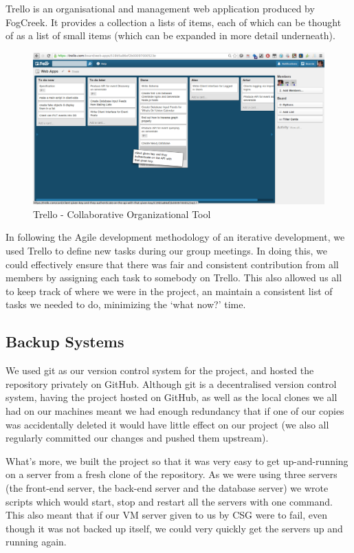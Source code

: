 \documentclass[11pt]{article}
\let\footnote=\endnote
\begin{document}
Trello\footnote{\url{http://trello.com}} is an organisational and management web application produced by FogCreek. It provides a collection a lists of items, each of which can be thought of as a list of small items (which can be expanded in more detail underneath).

\begin{figure}[H]
\centering
\includegraphics[scale=0.35]{images/trello.png}
\caption{\label{fig:trello} Trello - Collaborative Organizational Tool}
\end{figure}
In following the Agile development methodology of an iterative development, we used Trello to define new tasks during our group meetings. In doing this, we could effectively ensure that there was fair and consistent contribution from all members by assigning each task to somebody on Trello. This also allowed us all to keep track of where we were in the project, an maintain a consistent list of tasks we needed to do, minimizing the `what now?' time.

\subsection {Backup Systems}
We used git as our version control system for the project, and hosted the repository privately on GitHub. Although git is a decentralised version control system, having the project hosted on GitHub, as well as the local clones we all had on our machines meant we had enough redundancy that if one of our copies was accidentally deleted it would have little effect on our project (we also all regularly committed our changes and pushed them upstream).

What's more, we built the project so that it was very easy to get up-and-running on a server from a fresh clone of the repository. As we were using three servers (the front-end server, the back-end server and the database server) we wrote scripts which would start, stop and restart all the servers with one command. This also meant that if our VM server given to us by CSG were to fail, even though it was not backed up itself, we could very quickly get the servers up and running again.
\end{document}
